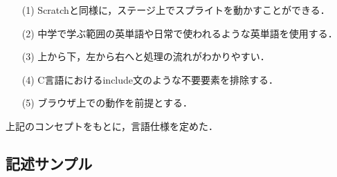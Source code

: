 \documentclass[twocolumn,10pt,a4j]{ltjsarticle}
\begin{document}
\begin{enumerate}
   \item[(1)] Scratchと同様に，ステージ上でスプライトを動かすことができる．
   \item[(2)] 中学で学ぶ範囲の英単語や日常で使われるような英単語を使用する．
   \item[(3)] 上から下，左から右へと処理の流れがわかりやすい．
   \item[(4)] C言語におけるinclude文のような不要要素を排除する．
   \item[(5)] ブラウザ上での動作を前提とする．
\end{enumerate}

上記のコンセプトをもとに，言語仕様を定めた．

\subsection{記述サンプル}
\end{document}
